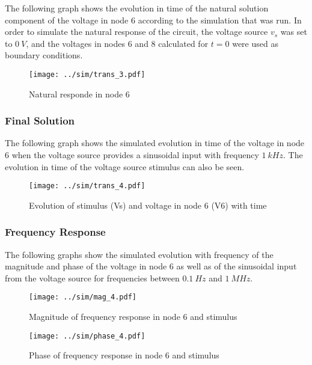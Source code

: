 The following graph shows the evolution in time of the natural solution component of the voltage in node 6 according to the simulation that was run. In order to simulate the natural response of the circuit, the voltage source $v_s$ was set to $0 \ V$, and the voltages in nodes 6 and 8 calculated for $t=0$ were used as boundary conditions.

\begin{figure}[H] \centering
\texttt{[image: ../sim/trans\_3.pdf]}
\caption{Natural responde in node 6}
\label{fig:natural_sim}
\end{figure}

\subsubsection{Final Solution}

The following graph shows the simulated evolution in time of the voltage in node 6 when the voltage source provides a sinusoidal input with frequency $1 \ kHz$. The evolution in time of the voltage source stimulus can also be seen.

\begin{figure}[H] \centering
\texttt{[image: ../sim/trans\_4.pdf]}
\caption{Evolution of stimulus (Vs) and voltage in node 6 (V6) with time}
\label{fig:final_sim}
\end{figure}

\subsubsection{Frequency Response}

The following graphs show the simulated evolution with frequency of the magnitude and phase of the voltage in node 6 as well as of the sinusoidal input from the voltage source for frequencies between $0.1 \ Hz$ and $1 \ MHz$.

\begin{figure}[H] \centering
\texttt{[image: ../sim/mag\_4.pdf]}
\caption{Magnitude of frequency response in node 6 and stimulus}
\label{fig:mag_sim}
\end{figure}


\begin{figure}[H] \centering
\texttt{[image: ../sim/phase\_4.pdf]}
\caption{Phase of frequency response in node 6 and stimulus}
\label{fig:phase_sim}
\end{figure}
